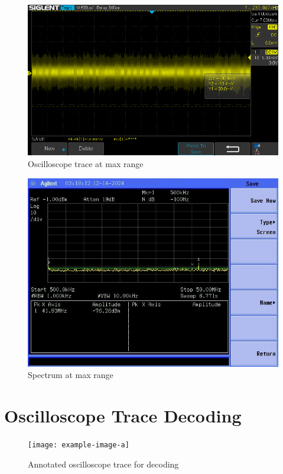\documentclass[letterpaper,12pt]{article}
\begin{document}
\begin{figure}[H]
	\begin{centering}
		\includegraphics[width=0.5\columnwidth]{figures/maxm.trace}
		\caption{Oscilloscope trace at max range}
	\end{centering}
\end{figure}

\begin{figure}[H]
	\begin{centering}
		\includegraphics[width=0.5\columnwidth]{figures/maxm.spectra}
		\caption{Spectrum at max range}
	\end{centering}
\end{figure}


\newpage
\section{Oscilloscope Trace Decoding}
\begin{figure}[H]
	\begin{centering}
		\texttt{[image: example-image-a]}
		\caption{Annotated oscilloscope trace for decoding}
	\end{centering}
\end{figure}

\newpage
\end{document}
